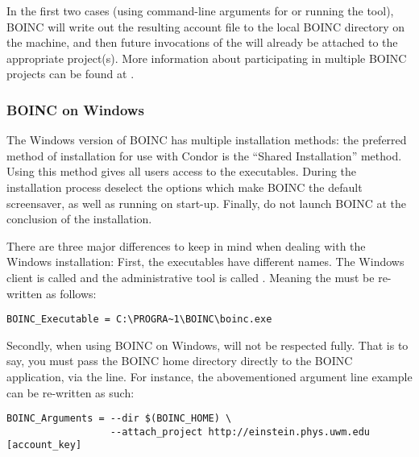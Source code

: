 In the first two cases (using command-line arguments for
 or running the  tool), BOINC
will write out the resulting account file to the local BOINC directory
on the machine, and then future invocations of the
 will already be attached to the appropriate
project(s).
More information about participating in multiple BOINC projects can be
found at .

\subsubsection{\label{sec:Backfill-BOINC-Windows}BOINC on Windows}

The Windows version of BOINC has multiple installation methods: the 
preferred method of installation for use with Condor is the 
``Shared Installation'' method.  Using this method gives all users 
access to the executables.  During the installation process 
deselect the options which make BOINC the default screensaver, as well 
as running on start-up.  Finally, do not launch BOINC at the conclusion
of the installation.

There are three major differences to keep in mind when dealing with 
the Windows installation: First, the executables have different names.  
The Windows client is called  and the administrative 
tool is called . Meaning the  
must be re-written as follows:

\footnotesize
\begin{verbatim}
BOINC_Executable = C:\PROGRA~1\BOINC\boinc.exe
\end{verbatim}
\normalsize
  
Secondly, when using BOINC on Windows,  will not 
be respected fully.  That is to say, you must pass the BOINC home 
directory directly to the BOINC application, via the 
line. For instance, the abovementioned argument line example can be 
re-written as such:

\footnotesize
\begin{verbatim}
BOINC_Arguments = --dir $(BOINC_HOME) \
                  --attach_project http://einstein.phys.uwm.edu [account_key] 
\end{verbatim}
\normalsize

